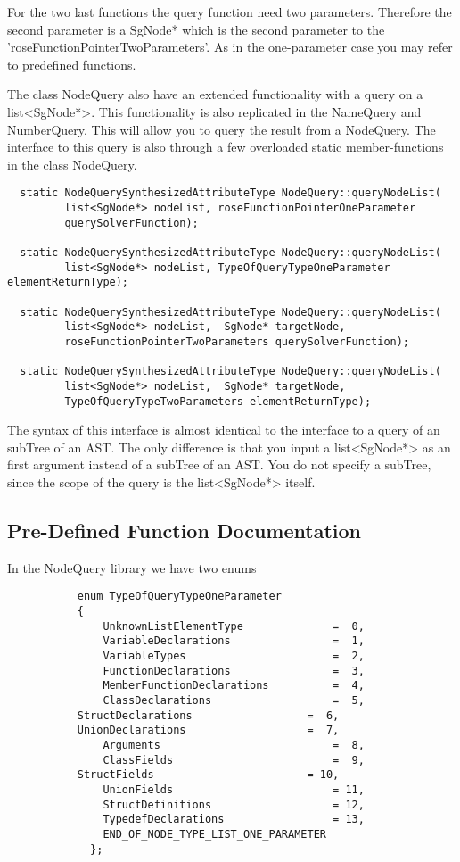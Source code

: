 {For the two last functions the query function need two
parameters. Therefore the second parameter is a SgNode* which is the
second parameter to the 'roseFunctionPointerTwoParameters'. As in the
one-parameter case you may refer to predefined functions.

The class NodeQuery also have an extended functionality with a query
on a list<SgNode*>. This functionality is also replicated in the
NameQuery and NumberQuery. This will allow you to query the result
from a NodeQuery. The interface to this query is also through a few
overloaded static member-functions in the class NodeQuery.
\begin{verbatim}
  static NodeQuerySynthesizedAttributeType NodeQuery::queryNodeList(
         list<SgNode*> nodeList, roseFunctionPointerOneParameter
         querySolverFunction);

  static NodeQuerySynthesizedAttributeType NodeQuery::queryNodeList(
         list<SgNode*> nodeList, TypeOfQueryTypeOneParameter elementReturnType);
	  
  static NodeQuerySynthesizedAttributeType NodeQuery::queryNodeList(
         list<SgNode*> nodeList,  SgNode* targetNode, 
         roseFunctionPointerTwoParameters querySolverFunction);  

  static NodeQuerySynthesizedAttributeType NodeQuery::queryNodeList(
         list<SgNode*> nodeList,  SgNode* targetNode, 
         TypeOfQueryTypeTwoParameters elementReturnType);
\end{verbatim}
The syntax of this interface is almost identical to the interface to a query
of an subTree of an AST.  The only difference is that you input a
list<SgNode*> as an first argument instead of a subTree of an AST. You
do not specify a subTree, since the scope of the query is the list<SgNode*> itself.  

\subsection{Pre-Defined Function Documentation}
\label{FunctionDocumentation}

In the NodeQuery library we have two enums
\begin{verbatim}
           enum TypeOfQueryTypeOneParameter		
	       {
               UnknownListElementType              =  0,
               VariableDeclarations                =  1,
               VariableTypes                       =  2,
               FunctionDeclarations                =  3,
               MemberFunctionDeclarations          =  4,
               ClassDeclarations                   =  5,
	       StructDeclarations                  =  6,
	       UnionDeclarations                   =  7,
               Arguments                           =  8,
               ClassFields                         =  9,
	       StructFields                        = 10,
               UnionFields                         = 11,
               StructDefinitions                   = 12,
               TypedefDeclarations                 = 13,
               END_OF_NODE_TYPE_LIST_ONE_PARAMETER
             };
	 

\end{verbatim}}
